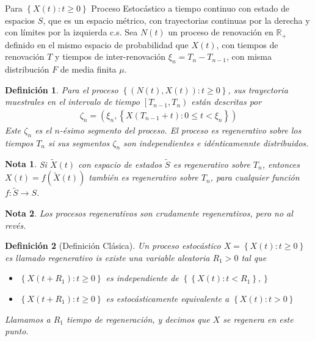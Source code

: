 \documentclass{article}
\newtheorem{Def}{Definición}
\newtheorem{Note}{Nota}
\newcommand{\rea}{\mathbb{R}}
\begin{document}
Para $\left\{X\left(t\right):t\geq0\right\}$ Proceso Estoc\'astico a tiempo continuo con estado de espacios $S$, que es un espacio m\'etrico, con trayectorias continuas por la derecha y con l\'imites por la izquierda c.s. Sea $N\left(t\right)$ un proceso de renovaci\'on en $\rea_{+}$ definido en el mismo espacio de probabilidad que $X\left(t\right)$, con tiempos de renovaci\'on $T$ y tiempos de inter-renovaci\'on $\xi_{n}=T_{n}-T_{n-1}$, con misma distribuci\'on $F$ de media finita $\mu$.



\begin{Def}
Para el proceso $\left\{\left(N\left(t\right),X\left(t\right)\right):t\geq0\right\}$, sus trayectoria muestrales en el intervalo de tiempo $\left[T_{n-1},T_{n}\right)$ est\'an descritas por
\begin{eqnarray*}
\zeta_{n}=\left(\xi_{n},\left\{X\left(T_{n-1}+t\right):0\leq t<\xi_{n}\right\}\right)
\end{eqnarray*}
Este $\zeta_{n}$ es el $n$-\'esimo segmento del proceso. El proceso es regenerativo sobre los tiempos $T_{n}$ si sus segmentos $\zeta_{n}$ son independientes e id\'enticamennte distribuidos.
\end{Def}


\begin{Note}
Si $\tilde{X}\left(t\right)$ con espacio de estados $\tilde{S}$ es regenerativo sobre $T_{n}$, entonces $X\left(t\right)=f\left(\tilde{X}\left(t\right)\right)$ tambi\'en es regenerativo sobre $T_{n}$, para cualquier funci\'on $f:\tilde{S}\rightarrow S$.
\end{Note}

\begin{Note}
Los procesos regenerativos son crudamente regenerativos, pero no al rev\'es.
\end{Note}

\begin{Def}[Definici\'on Cl\'asica]
Un proceso estoc\'astico $X=\left\{X\left(t\right):t\geq0\right\}$ es llamado regenerativo is existe una variable aleatoria $R_{1}>0$ tal que
\begin{itemize}
\item[i)] $\left\{X\left(t+R_{1}\right):t\geq0\right\}$ es independiente de $\left\{\left\{X\left(t\right):t<R_{1}\right\},\right\}$
\item[ii)] $\left\{X\left(t+R_{1}\right):t\geq0\right\}$ es estoc\'asticamente equivalente a $\left\{X\left(t\right):t>0\right\}$
\end{itemize}

Llamamos a $R_{1}$ tiempo de regeneraci\'on, y decimos que $X$ se regenera en este punto.
\end{Def}
\end{document}
